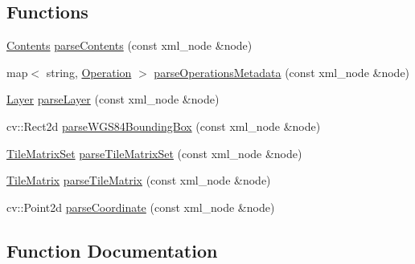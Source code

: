 \subsection*{Functions}
\begin{DoxyCompactItemize}
\item 
\hyperlink{structdg_1_1deepcore_1_1imagery_1_1wmts_1_1_contents}{Contents} \hyperlink{namespacedg_1_1deepcore_1_1imagery_1_1wmts_a31a76ad80e6b2533baf25db42d85be32}{parse\+Contents} (const xml\+\_\+node \&node)
\item 
map$<$ string, \hyperlink{structdg_1_1deepcore_1_1imagery_1_1wmts_1_1_operation}{Operation} $>$ \hyperlink{namespacedg_1_1deepcore_1_1imagery_1_1wmts_a3d537770a0ea9e28ddab365e085fef48}{parse\+Operations\+Metadata} (const xml\+\_\+node \&node)
\item 
\hyperlink{structdg_1_1deepcore_1_1imagery_1_1wmts_1_1_layer}{Layer} \hyperlink{namespacedg_1_1deepcore_1_1imagery_1_1wmts_a9b2fc450f6ad7939b01200952d9f0cdf}{parse\+Layer} (const xml\+\_\+node \&node)
\item 
cv\+::\+Rect2d \hyperlink{namespacedg_1_1deepcore_1_1imagery_1_1wmts_a0dfd07c2c45978eeca76b3f41b8fa1be}{parse\+W\+G\+S84\+Bounding\+Box} (const xml\+\_\+node \&node)
\item 
\hyperlink{structdg_1_1deepcore_1_1imagery_1_1wmts_1_1_tile_matrix_set}{Tile\+Matrix\+Set} \hyperlink{namespacedg_1_1deepcore_1_1imagery_1_1wmts_a7cb14cab7ce8ecc30b852e6bb3320988}{parse\+Tile\+Matrix\+Set} (const xml\+\_\+node \&node)
\item 
\hyperlink{structdg_1_1deepcore_1_1imagery_1_1wmts_1_1_tile_matrix}{Tile\+Matrix} \hyperlink{namespacedg_1_1deepcore_1_1imagery_1_1wmts_a3631933d78c31afb5aa46d64166208e3}{parse\+Tile\+Matrix} (const xml\+\_\+node \&node)
\item 
cv\+::\+Point2d \hyperlink{namespacedg_1_1deepcore_1_1imagery_1_1wmts_ae47bfc1d7ae820673ea56235915cee3f}{parse\+Coordinate} (const xml\+\_\+node \&node)
\end{DoxyCompactItemize}


\subsection{Function Documentation}
